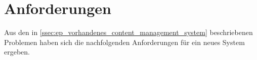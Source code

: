 \section{Anforderungen}
\label{sec:e_anforderungen}

Aus den in \cref{ssec:ep_vorhandenes_content_management_system} beschriebenen
Problemen haben sich die nachfolgenden Anforderungen für ein neues System
ergeben.




